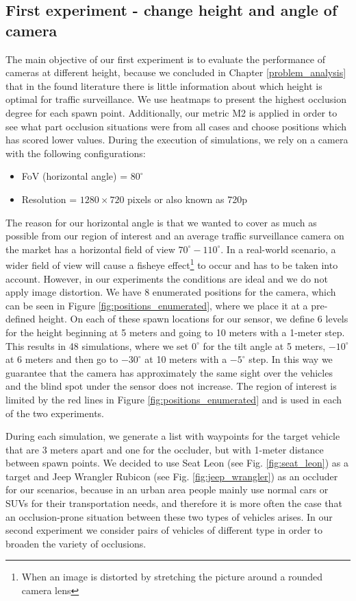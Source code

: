 \subsection{First experiment - change height and angle of camera}
The main objective of our first experiment is to evaluate the performance of cameras at different height, because we concluded in Chapter \ref{problem_analysis} that in the found literature there is little information about which height is optimal for traffic surveillance. We use heatmaps to present the highest occlusion degree for each spawn point. Additionally, our metric M2 is applied in order to see what part occlusion situations were from all cases and choose positions which has scored lower values. During the execution of simulations, we rely on a camera with the following configurations:
\begin{itemize}
    \item FoV (horizontal angle) = $80^{\circ}$
    \item Resolution = $1280\times720$ pixels or also known as 720p
\end{itemize}
The reason for our horizontal angle is that we wanted to cover as much as possible from our region of interest and an average traffic surveillance camera on the market has a horizontal field of view $70^{\circ} - 110^{\circ}$. In a real-world scenario, a wider field of view will cause a fisheye effect\footnote{When an image is distorted by stretching the picture around a rounded camera lens} to occur and has to be taken into account. However, in our experiments the conditions are ideal and we do not apply image distortion. We have 8 enumerated positions for the camera, which can be seen in Figure \ref{fig:positions_enumerated}, where we place it at a pre-defined height. On each of these spawn locations for our sensor, we define 6 levels for the height beginning at 5 meters and going to 10 meters with a 1-meter step. This results in 48 simulations, where we set $0^{\circ}$ for the tilt angle at 5 meters, $-10^{\circ}$ at 6 meters and then go to $-30^{\circ}$ at 10 meters with a $-5^{\circ}$ step. In this way we guarantee that the camera has approximately the same sight over the vehicles and the blind spot under the sensor does not increase. The region of interest is limited by the red lines in Figure \ref{fig:positions_enumerated} and is used in each of the two experiments.

During each simulation, we generate a list with waypoints for the target vehicle that are 3 meters apart and one for the occluder, but with 1-meter distance between spawn points. We decided to use Seat Leon (see Fig. \ref{fig:seat_leon}) as a target and Jeep Wrangler Rubicon (see Fig. \ref{fig:jeep_wrangler}) as an occluder for our scenarios, because in an urban area people mainly use normal cars or SUVs for their transportation needs, and therefore it is more often the case that an occlusion-prone situation between these two types of vehicles arises. In our second experiment we consider pairs of vehicles of different type in order to broaden the variety of occlusions.

